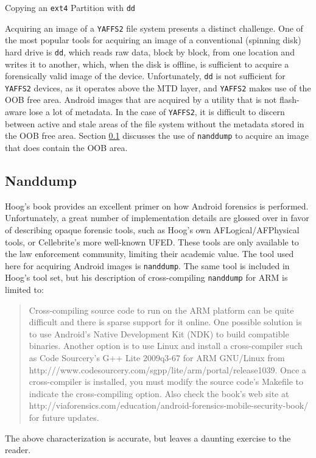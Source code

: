 \begin{table}[htb]
\lstset{numbers=none}

\caption{Copying an \texttt{ext4} Partition with \texttt{dd}}
\label{tab:dd}
\end{table}

Acquiring an image of a \texttt{YAFFS2} file system presents a distinct challenge.  One of the most popular tools for acquiring an
image of a conventional (spinning disk) hard drive is \texttt{dd}, which reads raw data, block by block, from one location and
writes it to another, which, when the disk is offline, is sufficient to acquire a forensically valid image of the device.
Unfortunately, \texttt{dd} is not sufficient for \texttt{YAFFS2} devices, as it operates above the MTD layer, and \texttt{YAFFS2}
makes use of the OOB free area. Android images that are acquired by a utility that is not flash-aware lose a lot of metadata. In the
case of \texttt{YAFFS2}, it is difficult to discern between active and stale areas of the file system without the metadata stored in
the OOB free area. Section \ref{sec:nanddump} discusses the use of \texttt{nanddump} to acquire an image that does contain the OOB
area.

\subsection{Nanddump}
\label{sec:nanddump}
Hoog's book \cite{hoog} provides an excellent primer on how Android forensics is performed.  Unfortunately, a great number of
implementation details are glossed over in favor of describing opaque forensic tools, such as Hoog's own AFLogical/AFPhysical tools,
or Cellebrite's more well-known UFED. These tools are only available to the law enforcement community, limiting their academic
value. The tool used here for acquiring Android images is \texttt{nanddump}. The same tool is included in Hoog's tool set, but his
description of cross-compiling \texttt{nanddump} for ARM is limited to: 
\begin{quote}
Cross-compiling source code to run on the ARM platform can be quite difficult and there is sparse support for it
online.  One possible solution is to use Android's Native Development Kit (NDK) to build compatible binaries.  Another option is to
use Linux and install a cross-compiler such as Code Sourcery's G++ Lite 2009q3-67 for ARM GNU/Linux from
http:///www.codesourcery.com/sgpp/lite/arm/portal/release1039.  Once a cross-compiler is installed, you must modify the source
code's Makefile to indicate the cross-compiling option.  Also check the book's web site at
http://viaforensics.com/education/android-forensics-mobile-security-book/ for future updates. \cite{hoog}
\end{quote}
The above characterization is accurate, but leaves a daunting exercise to the reader. 

